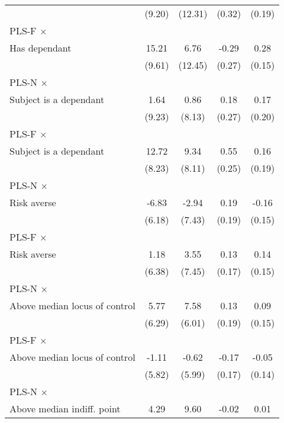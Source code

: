 \begin{table}[htbp]
\begin{tabular}{l*{4}{c}}
                &   (9.20)         &  (12.31)         &   (0.32)         &   (0.19)         \\
\addlinespace
PLS-F $\times$ \\ Has dependant&    15.21         &     6.76         &    -0.29         &     0.28\sym{*}  \\
                &   (9.61)         &  (12.45)         &   (0.27)         &   (0.15)         \\
\addlinespace
PLS-N $\times$ \\ Subject is a dependant&     1.64         &     0.86         &     0.18         &     0.17         \\
                &   (9.23)         &   (8.13)         &   (0.27)         &   (0.20)         \\
\addlinespace
PLS-F $\times$ \\ Subject is a dependant&    12.72         &     9.34         &     0.55\sym{**} &     0.16         \\
                &   (8.23)         &   (8.11)         &   (0.25)         &   (0.19)         \\
\addlinespace
PLS-N $\times$ \\ Risk averse&    -6.83         &    -2.94         &     0.19         &    -0.16         \\
                &   (6.18)         &   (7.43)         &   (0.19)         &   (0.15)         \\
\addlinespace
PLS-F $\times$ \\ Risk averse&     1.18         &     3.55         &     0.13         &     0.14         \\
                &   (6.38)         &   (7.45)         &   (0.17)         &   (0.15)         \\
\addlinespace
PLS-N $\times$ \\ Above median locus of control&     5.77         &     7.58         &     0.13         &     0.09         \\
                &   (6.29)         &   (6.01)         &   (0.19)         &   (0.15)         \\
\addlinespace
PLS-F $\times$ \\ Above median locus of control&    -1.11         &    -0.62         &    -0.17         &    -0.05         \\
                &   (5.82)         &   (5.99)         &   (0.17)         &   (0.14)         \\
\addlinespace
PLS-N $\times$ \\ Above median indiff. point&     4.29         &     9.60         &    -0.02         &     0.01         \\

\end{tabular}
\end{table}
